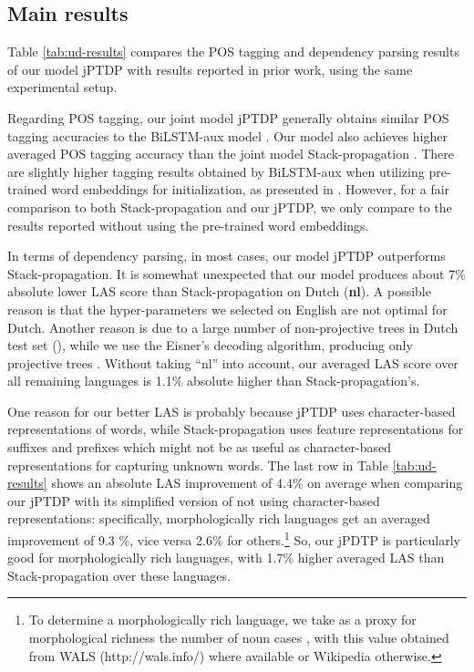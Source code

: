 \documentclass[11pt,letterpaper]{article}
\begin{document}
\subsection{Main results}

Table \ref{tab:ud-results} compares the POS tagging and dependency parsing results of our model jPTDP with  results reported in prior work,  using the same experimental setup.

Regarding POS tagging,  our joint model jPTDP generally obtains similar POS tagging accuracies  to the   BiLSTM-aux  model \citep{plankP16}. Our model also achieves higher averaged POS tagging accuracy  than the  joint   model Stack-propagation \citep{zhang-weiss:2016:P16-1}. There are slightly higher tagging results obtained by  BiLSTM-aux  when utilizing pre-trained word embeddings for initialization, as presented in \citet{plankP16}. However, for a fair comparison to both Stack-propagation and our jPTDP, we only compare to  the results reported without using the pre-trained word embeddings. 

In terms of dependency parsing, in most cases, our  model jPTDP  outperforms Stack-propagation. It is somewhat unexpected that our  model produces about 7\% absolute lower LAS score than Stack-propagation on Dutch (\textbf{nl}). 
A possible reason is
that the hyper-parameters we selected on English
are not optimal for Dutch. Another reason is due to a large number of non-projective  trees in Dutch test set (), while we use the Eisner's decoding algorithm, producing only  projective trees \citep{Eisner:1996}. Without taking ``nl'' into account, our averaged LAS score over all remaining languages is 1.1\% absolute higher than Stack-propagation's. 


One reason for our better LAS is probably because jPTDP uses character-based representations of words, while Stack-propagation uses feature representations for suffixes and prefixes which might not be as useful as character-based representations for capturing unknown words. The last row in  Table \ref{tab:ud-results} shows an absolute LAS improvement of 4.4\% on average  when comparing our jPTDP with its simplified version of not  using character-based representations: specifically, morphologically rich languages get an averaged improvement of 9.3 \%,  vice versa 2.6\% for others.\footnote{To determine a morphologically rich language, we take as a proxy for morphological richness the number of noun cases , with this value obtained from WALS (http://wals.info/) where
available  or Wikipedia otherwise.} 
So, our jPDTP is particularly good for morphologically rich languages, with  1.7\% higher averaged LAS than Stack-propagation over these languages.
\end{document}
